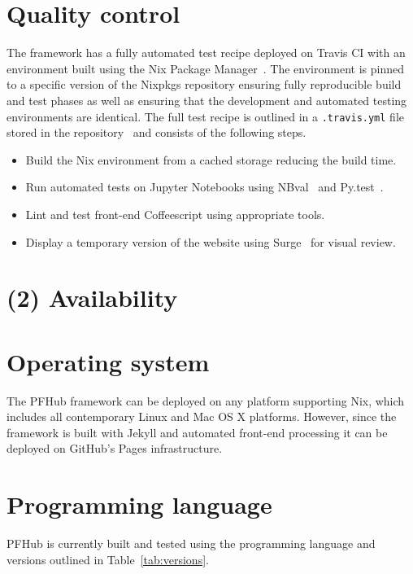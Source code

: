 \documentclass{jors}
\begin{document}
\section*{Quality control}

The framework has a fully automated test recipe deployed on Travis CI
with an environment built using the Nix Package
Manager~\cite{nix}. The environment is pinned to a specific version of
the Nixpkgs repository ensuring fully reproducible build and test
phases as well as ensuring that the development and automated testing
environments are identical. The full test recipe is outlined in a
\texttt{.travis.yml} file stored in the repository~\cite{travisyml}
and consists of the following steps.

\begin{itemize}
  \item Build the Nix environment from a cached storage reducing the
    build time.
  \item Run automated tests on Jupyter Notebooks using
    NBval~\cite{nbval} and Py.test~\cite{pytest}.
  \item Lint and test front-end Coffeescript using appropriate tools.
  \item Display a temporary version of the website using
    Surge~\cite{surge} for visual review.
\end{itemize}

\section*{(2) Availability}
\vspace{0.5cm}
\section*{Operating system}

The PFHub framework can be deployed on any platform supporting Nix,
which includes all contemporary Linux and Mac OS X platforms. However,
since the framework is built with Jekyll and automated front-end
processing it can be deployed on GitHub's Pages infrastructure.

\section*{Programming language}

PFHub is currently built and tested using the programming language and
versions outlined in Table~\ref{tab:versions}.
\end{document}
